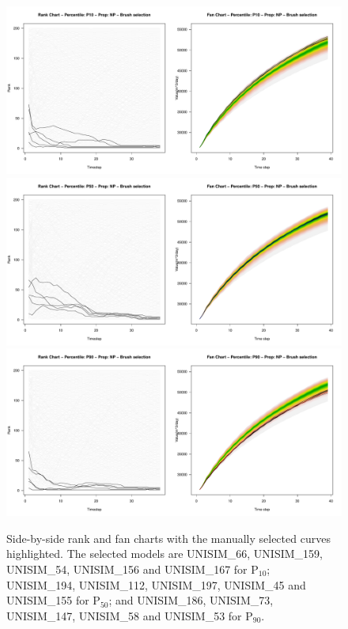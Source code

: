\documentclass[final,5p,times,twocolumn]{elsarticle}
\begin{document}
\begin{figure}[H]
  \centering
  \includegraphics[width=0.8\columnwidth]{rank-fan-brush-p10.pdf}
  \includegraphics[width=0.8\columnwidth]{rank-fan-brush-p50.pdf}
  \includegraphics[width=0.8\columnwidth]{rank-fan-brush-p90.pdf}
  \caption{Side-by-side rank and fan charts with the manually selected curves highlighted. The selected models are UNISIM\_66, UNISIM\_159, UNISIM\_54, UNISIM\_156 and UNISIM\_167 for P$_{10}$; UNISIM\_194, UNISIM\_112, UNISIM\_197, UNISIM\_45 and UNISIM\_155 for P$_{50}$; and UNISIM\_186, UNISIM\_73, UNISIM\_147, UNISIM\_58 and UNISIM\_53 for P$_{90}$.}
  \label{fig:rank-fan-brush}
\end{figure}
\end{document}
